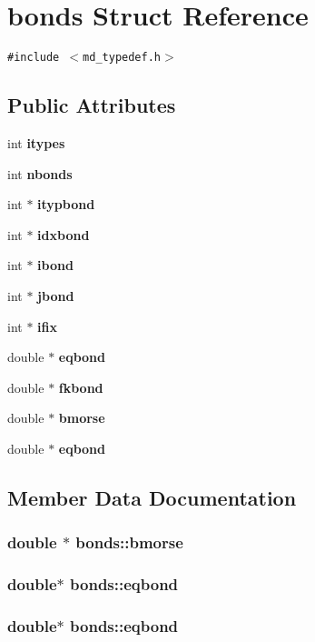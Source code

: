 \section{bonds Struct Reference}
\label{structbonds}
{\tt \#include $<$md\_\-typedef.h$>$}

\subsection*{Public Attributes}
\begin{CompactItemize}
\item 
int {\bf itypes}
\item 
int {\bf nbonds}
\item 
int $\ast$ {\bf itypbond}
\item 
int $\ast$ {\bf idxbond}
\item 
int $\ast$ {\bf ibond}
\item 
int $\ast$ {\bf jbond}
\item 
int $\ast$ {\bf ifix}
\item 
double $\ast$ {\bf eqbond}
\item 
double $\ast$ {\bf fkbond}
\item 
double $\ast$ {\bf bmorse}
\item 
double $\ast$ {\bf eqbond}
\end{CompactItemize}


\subsection{Member Data Documentation}
\subsubsection{\setlength{\rightskip}{0pt plus 5cm}double $\ast$ {\bf bonds::bmorse}}\label{structbonds_3ce5dcd8a99165d3fa77be0cdbfbf707}


\subsubsection{\setlength{\rightskip}{0pt plus 5cm}double$\ast$ {\bf bonds::eqbond}}\label{structbonds_4e509e864392c888456e3c0f7c226d27}


\subsubsection{\setlength{\rightskip}{0pt plus 5cm}double$\ast$ {\bf bonds::eqbond}}\label{structbonds_4e509e864392c888456e3c0f7c226d27}


